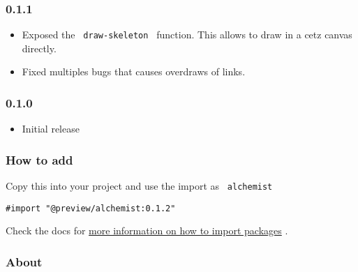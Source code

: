 \subsubsection{0.1.1}\label{section-1}

\begin{itemize}
\tightlist
\item
  Exposed the \texttt{\ draw-skeleton\ } function. This allows to draw
  in a cetz canvas directly.
\item
  Fixed multiples bugs that causes overdraws of links.
\end{itemize}

\subsubsection{0.1.0}\label{section-2}

\begin{itemize}
\tightlist
\item
  Initial release
\end{itemize}

\subsubsection{How to add}\label{how-to-add}

Copy this into your project and use the import as \texttt{\ alchemist\ }

\begin{verbatim}
#import "@preview/alchemist:0.1.2"
\end{verbatim}



Check the docs for
\href{https://typst.app/docs/reference/scripting/\#packages}{more
information on how to import packages} .

\subsubsection{About}\label{about}

